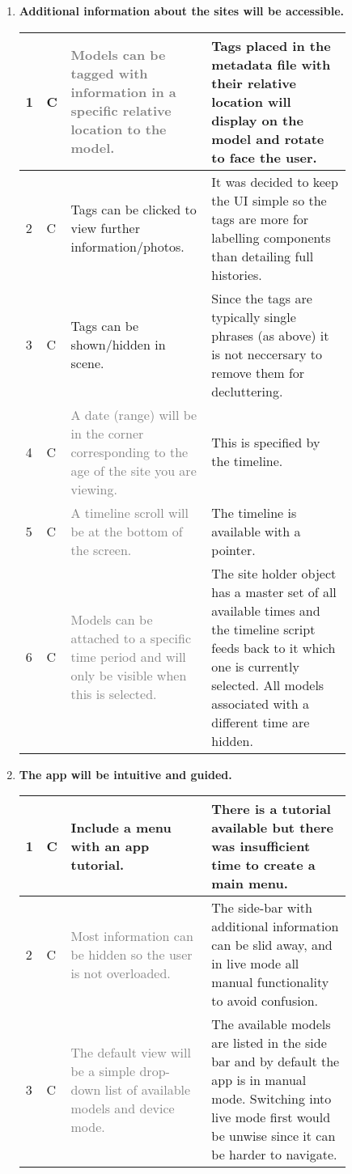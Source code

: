 \documentclass{article}
\newcommand{\light}[1]{\textcolor{gray}{#1}}
\begin{document}
\begin{enumerate}[label=\Roman*.]
\item \textbf{Additional information about the sites will be accessible.}

\begin{table}[H]
\begin{tabular}{| p{0.02\linewidth} | p{0.02\linewidth} | p{0.4\linewidth} | p{0.4\linewidth} | }
\hline
1 & C & \light{Models can be tagged with information in a specific relative location to the model.} & Tags placed in the metadata file with their relative location will display on the model and rotate to face the user. \\ \hline
2 & C & Tags can be clicked to view further information/photos. & It was decided to keep the UI simple so the tags are more for labelling components than detailing full histories. \\ \hline
3 & C & Tags can be shown/hidden in scene. & Since the tags are typically single phrases (as above) it is not neccersary to remove them for decluttering. \\ \hline
4 & C & \light{A date (range) will be in the corner corresponding to the age of the site you are viewing.} & This is specified by the timeline. \\ \hline
5 & C & \light{A timeline scroll will be at the bottom of the screen.} & The timeline is available with a pointer. \\ \hline
6 & C & \light{Models can be attached to a specific time period and will only be visible when this is selected.} & The site holder object has a master set of all available times and the timeline script feeds back to it which one is currently selected. All models associated with a different time are hidden. \\ \hline
\end{tabular}
\end{table}

\item \textbf{The app will be intuitive and guided.}

\begin{table}[H]
\begin{tabular}{| p{0.02\linewidth} | p{0.02\linewidth} | p{0.4\linewidth} | p{0.4\linewidth} | }
\hline
1 & C & Include a menu with an app tutorial. & There is a tutorial available but there was insufficient time to create a main menu. \\ \hline
2 & C & \light{Most information can be hidden so the user is not overloaded.} & The side-bar with additional information can be slid away, and in live mode all manual functionality to avoid confusion. \\ \hline
3 & C & \light{The default view will be a simple drop-down list of available models and device mode.} & The available models are listed in the side bar and by default the app is in manual mode. Switching into live mode first would be unwise since it can be harder to navigate. \\ \hline
\end{tabular}
\end{table}

\end{enumerate}
\end{document}
